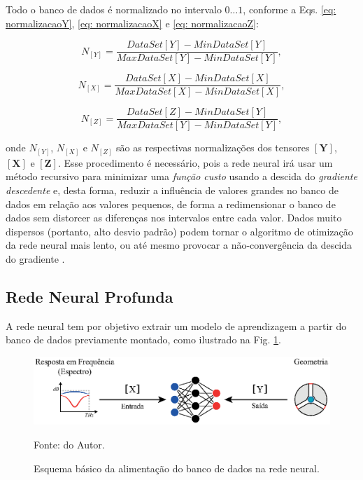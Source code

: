 Todo o banco de dados é normalizado no intervalo $0\dotso 1$, conforme a Eqs. \ref{eq: normalizacaoY}, \ref{eq: normalizacaoX} e \ref{eq: normalizacaoZ}:

\begin{equation}
\label{eq: normalizacaoY}
N_{[Y]} = \frac{DataSet[Y] - MinDataSet[Y]}{MaxDataSet[Y] - MinDataSet[Y]},
\end{equation}

\begin{equation}
    \label{eq: normalizacaoX}
    N_{[X]} = \frac{DataSet[X] - MinDataSet[X]}{MaxDataSet[X] - MinDataSet[X]},
\end{equation}

\begin{equation}
    \label{eq: normalizacaoZ}
    N_{[Z]} = \frac{DataSet[Z] - MinDataSet[Y]}{MaxDataSet[Y] - MinDataSet[Y]},
\end{equation}

\noindent
onde $N_{[Y]}$, $N_{[X]}$ e $N_{[Z]}$ são as respectivas normalizações dos tensores $\mathbf{[Y]}$, $\mathbf{[X]}$ e $\mathbf{[Z]}$. Esse procedimento é necessário, pois a rede neural irá usar um método recursivo para minimizar uma \textit{função custo} usando a descida do \textit{gradiente descedente} \cite{bottou2010large,geron2019hands} e, desta forma, reduzir a influência de valores grandes no banco de dados em relação aos valores pequenos, de forma a redimensionar o banco de dados sem distorcer as diferenças nos intervalos entre cada valor. Dados muito dispersos (portanto, alto desvio padrão) podem tornar o algoritmo de otimização da rede neural mais lento, ou até mesmo provocar a não-convergência da descida do gradiente \cite{geron2019hands}.


\subsection{Rede Neural Profunda}

A rede neural tem por objetivo extrair um modelo de aprendizagem a partir do banco de dados previamente montado, como ilustrado na Fig. \ref{fig: StepNetwork-a}.

\begin{figure}[H]
    \centering
    \includegraphics{04-Figuras/StepNetwork-a.eps}
    \caption{Esquema básico da alimentação do banco de dados na rede neural.} \par
    Fonte: do Autor.
    \label{fig: StepNetwork-a}
\end{figure}

